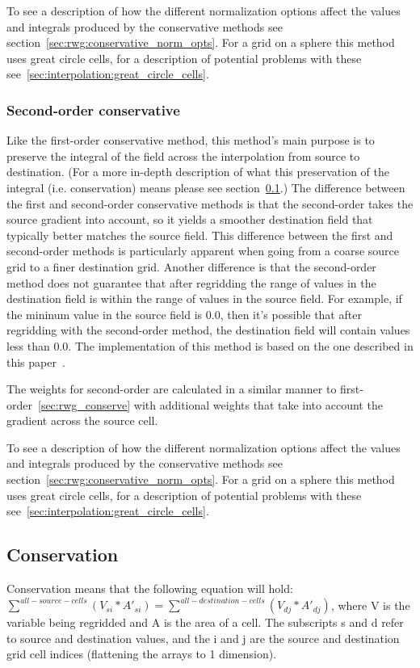 To see a description of how the different normalization options affect the values and integrals produced by the conservative methods see section~\ref{sec:rwg:conservative_norm_opts}. For a grid on a sphere this method uses great circle cells, for a description of potential problems with these see~\ref{sec:interpolation:great_circle_cells}.

\subsubsection{Second-order conservative}\label{sec:rwg_conserve2d}
 Like the first-order conservative method, this method's main purpose is to preserve the integral of the field across the interpolation from source to destination.  
 (For a more in-depth description of what this preservation of the integral (i.e. conservation) means please see section~\ref{sec:rwg:conservation}.)  The difference between the first and second-order conservative methods is that the second-order takes the source gradient into account, so
 it yields a smoother destination field that typically better matches the source field. This difference between the first and second-order methods 
 is particularly apparent when going from a coarse source grid to a finer destination grid. Another difference is that the second-order method
  does not guarantee that after regridding the range of values in the destination field is within the range of 
 values in the source field. For example, if the mininum value in the source field is 0.0, then it's possible that after regridding with the 
 second-order method, the destination field will contain values less than 0.0. The implementation of this method is based on the one described in this paper~\cite{ConservativeOrder2}.

  The weights for second-order are calculated in a similar manner to first-order~\ref{sec:rwg_conserve} with additional weights that take into account the gradient across the source cell. 

To see a description of how the different normalization options affect the values and integrals produced by the conservative methods see section~\ref{sec:rwg:conservative_norm_opts}. For a grid on a sphere this method uses great circle cells, for a description of potential problems with these see~\ref{sec:interpolation:great_circle_cells}.

\subsection{Conservation}\label{sec:rwg:conservation}
 Conservation means that the following equation will hold:
  $\sum^{all-source-cells}(V_{si}*A'_{si}) = \sum^{all-destination-cells}(V_{dj}*A'_{dj})$, where
 V is the variable being regridded and A is the area of a cell.  
 The subscripts s and d refer to source and destination values, and the i and j are the source
 and destination grid cell indices (flattening the arrays to 1 dimension). 

